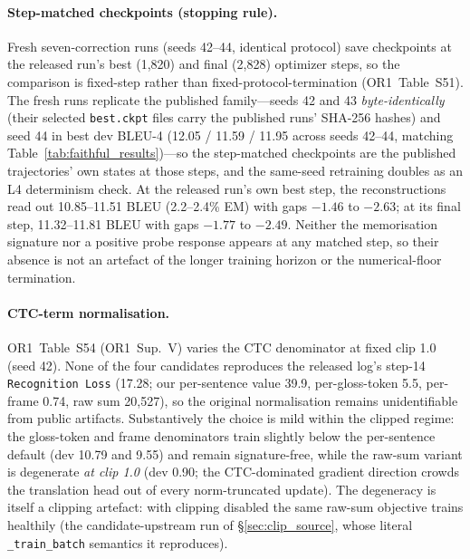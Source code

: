 \documentclass[pdflatex,sn-chicago]{sn-jnl}
\begin{document}
\paragraph{Step-matched checkpoints (stopping rule).}
Fresh seven-correction runs (seeds 42--44, identical protocol) save checkpoints at the released run's best (1{,}820) and final (2{,}828) optimizer steps, so the comparison is fixed-step rather than fixed-protocol-termination (OR1~Table~S51). The fresh runs replicate the published family---seeds 42 and 43 \emph{byte-identically} (their selected \texttt{best.ckpt} files carry the published runs' SHA-256 hashes) and seed 44 in best dev BLEU-4 (12.05 / 11.59 / 11.95 across seeds 42--44, matching Table~\ref{tab:faithful_results})---so the step-matched checkpoints are the published trajectories' own states at those steps, and the same-seed retraining doubles as an L4 determinism check. At the released run's own best step, the reconstructions read out 10.85--11.51 BLEU (2.2--2.4\% EM) with gaps $-1.46$ to $-2.63$; at its final step, 11.32--11.81 BLEU with gaps $-1.77$ to $-2.49$. Neither the memorisation signature nor a positive probe response appears at any matched step, so their absence is not an artefact of the longer training horizon or the numerical-floor termination.

\paragraph{CTC-term normalisation.}
OR1~Table~S54 (OR1~Sup.~V) varies the CTC denominator at fixed clip 1.0 (seed 42). None of the four candidates reproduces the released log's step-14 \texttt{Recognition Loss} (17.28; our per-sentence value 39.9, per-gloss-token 5.5, per-frame 0.74, raw sum 20{,}527), so the original normalisation remains unidentifiable from public artifacts. Substantively the choice is mild within the clipped regime: the gloss-token and frame denominators train slightly below the per-sentence default (dev 10.79 and 9.55) and remain signature-free, while the raw-sum variant is degenerate \emph{at clip 1.0} (dev 0.90; the CTC-dominated gradient direction crowds the translation head out of every norm-truncated update). The degeneracy is itself a clipping artefact: with clipping disabled the same raw-sum objective trains healthily (the candidate-upstream run of \S\ref{sec:clip_source}, whose literal \texttt{\_train\_batch} semantics it reproduces).
\end{document}
